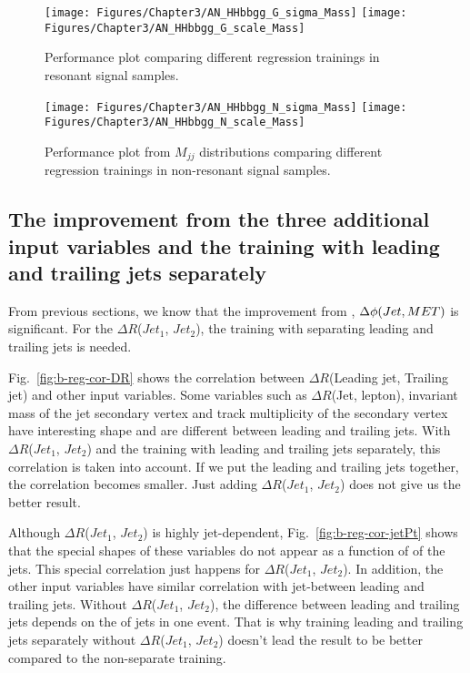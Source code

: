 \begin{figure*}[thb]
  \centering
  \texttt{[image: Figures/Chapter3/AN\_HHbbgg\_G\_sigma\_Mass]}\hfil
  \texttt{[image: Figures/Chapter3/AN\_HHbbgg\_G\_scale\_Mass]}\hfil
  \caption{Performance plot comparing different regression trainings in resonant signal samples.}
  \label{fig:b-reg-mH-res}
\end{figure*}

\begin{figure*}[thb]
  \centering
  \texttt{[image: Figures/Chapter3/AN\_HHbbgg\_N\_sigma\_Mass]}\hfil
  \texttt{[image: Figures/Chapter3/AN\_HHbbgg\_N\_scale\_Mass]}\hfil
  \caption{Performance plot from $M_{jj}$ distributions comparing different regression trainings in non-resonant signal samples.}
  \label{fig:b-reg-mH-nonres}
\end{figure*}


\clearpage

\subsection{The improvement from the three additional input variables and 
the training with leading and trailing jets separately}

From previous sections, we know that the improvement from \MET, $\Delta\phi(Jet, MET)$ is significant.
For the $\Delta R$($Jet_{1}$, $Jet_{2}$), the training with separating leading and trailing jets is needed.

Fig.~\ref{fig:b-reg-cor-DR} shows the correlation between $\Delta R$(Leading jet, Trailing jet) and other input variables.
Some variables such as $\Delta R$(Jet, lepton), invariant mass of the jet secondary vertex and track multiplicity of the secondary vertex have interesting shape and are different between leading and trailing jets.
With $\Delta R$($Jet_{1}$, $Jet_{2}$) and the training with leading and trailing jets separately, this correlation is taken into account.
If we put the leading and trailing jets together, the correlation becomes smaller. 
Just adding $\Delta R$($Jet_{1}$, $Jet_{2}$) does not give us the better result.

Although $\Delta R$($Jet_{1}$, $Jet_{2}$) is highly jet-\PT dependent, Fig.~\ref{fig:b-reg-cor-jetPt} shows that the special shapes of these variables do not appear as a function of \PT of the jets.
This special correlation just happens for $\Delta R$($Jet_{1}$, $Jet_{2}$).
In addition, the other input variables have similar correlation with jet-\pT between leading and trailing jets.
Without $\Delta R$($Jet_{1}$, $Jet_{2}$), the difference between leading and trailing jets depends on the \PT of jets in one event.
That is why training leading and trailing jets separately without $\Delta R$($Jet_{1}$, $Jet_{2}$) doesn't lead the result to be better compared to the non-separate training.

